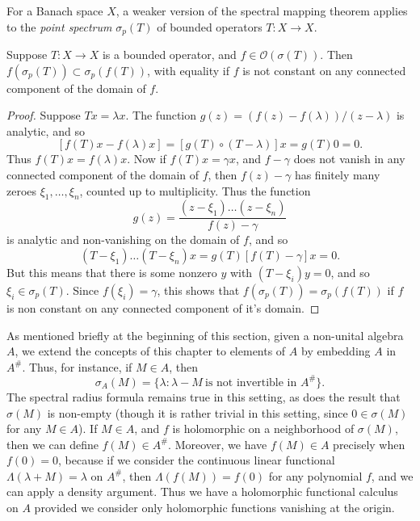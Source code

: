 For a Banach space $X$, a weaker version of the spectral mapping theorem applies to the \emph{point spectrum} $\sigma_p(T)$ of bounded operators $T: X \to X$.

\begin{theorem}
    Suppose $T: X \to X$ is a bounded operator, and $f \in \mathcal{O}(\sigma(T))$. Then $f(\sigma_p(T)) \subset \sigma_p(f(T))$, with equality if $f$ is not constant on any connected component of the domain of $f$.
\end{theorem}
\begin{proof}
    Suppose $Tx = \lambda x$. The function $g(z) = (f(z) - f(\lambda)) / (z - \lambda)$ is analytic, and so
    \[ [f(T) x - f(\lambda) x] = [g(T) \circ (T - \lambda)] x = g(T) 0 = 0. \]
    Thus $f(T) x = f(\lambda) x$. Now if $f(T) x = \gamma x$, and $f - \gamma$ does not vanish in any connected component of the domain of $f$, then $f(z) - \gamma$ has finitely many zeroes $\xi_1, \dots, \xi_n$, counted up to multiplicity. Thus the function
    \[ g(z) = \frac{(z - \xi_1) \dots (z - \xi_n)}{f(z) - \gamma} \]
    is analytic and non-vanishing on the domain of $f$, and so
    \[ (T - \xi_1) \dots (T - \xi_n) x = g(T) [f(T) - \gamma] x = 0. \]
    But this means that there is some nonzero $y$ with $(T - \xi_i) y = 0$, and so $\xi_i \in \sigma_p(T)$. Since $f(\xi_i) = \gamma$, this shows that $f(\sigma_p(T)) = \sigma_p(f(T))$ if $f$ is non constant on any connected component of it's domain.
\end{proof}

As mentioned briefly at the beginning of this section, given a non-unital algebra $A$, we extend the concepts of this chapter to elements of $A$ by embedding $A$ in $A^\#$. Thus, for instance, if $M \in A$, then
%
\[ \sigma_A(M) = \{ \lambda : \lambda - M\ \text{is not invertible in $A^\#$} \}. \]
%
The spectral radius formula remains true in this setting, as does the result that $\sigma(M)$ is non-empty (though it is rather trivial in this setting, since $0 \in \sigma(M)$ for any $M \in A$). If $M \in A$, and $f$ is holomorphic on a neighborhood of $\sigma(M)$, then we can define $f(M) \in A^\#$. Moreover, we have $f(M) \in A$ precisely when $f(0) = 0$, because if we consider the continuous linear functional $\Lambda(\lambda + M) = \lambda$ on $A^\#$, then $\Lambda(f(M)) = f(0)$ for any polynomial $f$, and we can apply a density argument. Thus we have a holomorphic functional calculus on $A$ provided we consider only holomorphic functions vanishing at the origin.








